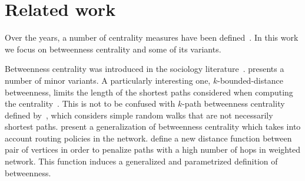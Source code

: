 \section{Related work}\label{sec:prevwork}
Over the years, a number of centrality measures have been defined~\citep{Newman10}. In this work
we focus on betweenness centrality and some of its variants. 

Betweenness centrality was introduced in the sociology
literature~\citep{Anthonisse71,Freeman77}. \citet{Brandes08} presents a number
of minor variants. A particularly interesting one, $k$-bounded-distance
betweenness, limits the length of the shortest paths considered when computing
the centrality~\citep{BorgattiE06,Brandes08,PfefferC12}. This is not to be
confused with $k$-path betweenness centrality defined
by~\citet{KourtellisASIT12}, which considers simple random walks that are not
necessarily shortest paths. \citet{DolevEP10} present a generalization of
betweenness centrality which takes into account routing policies in the network. %
\ifproof
\citet{OpsahlAS10} define a new distance function between pair of vertices in
order to penalize paths with a high number of hops in weighted network. This
function induces a generalized and parametrized definition of betweenness.
\fi

